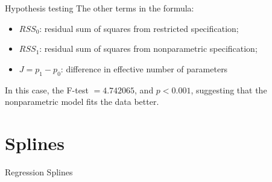 \documentclass[12pt,english,pdf,xcolor=dvipsnames,aspectratio=169,handout]{beamer}\usepackage[]{graphicx}\usepackage[]{xcolor}
\begin{document}
\begin{frame}{Hypothesis testing}
  The other terms in the formula:

  \begin{itemize}
  \item $RSS_0$: residual sum of squares from restricted specification;
  \item $RSS_1$: residual sum of squares from nonparametric specification;
  \item $J = p_1 - p_0$: difference in effective number of parameters
  \end{itemize}



In this case, the F-test $=4.742065$, and $p<0.001$, suggesting that the nonparametric model fits the data better.
  
\end{frame}
  





\section{Splines}


\begin{frame}
\begin{center}
    \Huge Regression Splines
\end{center}
\end{frame}
\end{document}

